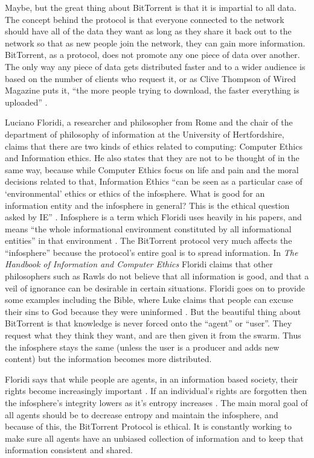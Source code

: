 \documentclass[11pt]{article}
\begin{document}
\begin{multicols}{2}
Maybe, but the great thing about BitTorrent is that it is impartial to all data. The concept behind the protocol is that everyone connected to the network should have all of the data they want as long as they share it back out to the network so that as new people join the network, they can gain more information. BitTorrent, as a protocol, does not promote any one piece of data over another. The only way any piece of data gets distributed faster and to a wider audience is based on the number of clients who request it, or as Clive Thompson of Wired Magazine puts it, ``the more people trying to download, the faster everything is uploaded'' \cite{wiredbt}.

Luciano Floridi, a researcher and philosopher from Rome and the chair of the department of philosophy of information at the University of Hertfordshire, claims that there are two kinds of ethics related to computing: Computer Ethics and Information ethics. He also states that they are not to be thought of in the same way, because while Computer Ethics focus on life and pain and the moral decisions related to that, Information Ethics ``can be seen as a particular case of `environmental' ethics or ethics of the infosphere. What is good for an information entity and the infosphere in general? This is the ethical question asked by IE'' \cite[1]{floridiInfo}. Infosphere is a term which Floridi uses heavily in his papers, and means ``the whole informational environment constituted by all informational entities'' in that environment \cite[3]{ethicshandbook}. The BitTorrent protocol very much affects the ``infosphere'' because the protocol's entire goal is to spread information. In \textit{The Handbook of Information and Computer Ethics} Floridi claims that other philosophers such as Rawls do not believe that all information is good, and that a veil of ignorance can be desirable in certain situations. Floridi goes on to provide some examples including the Bible, where Luke claims that people can excuse their sins to God because they were uninformed \cite[6]{ethicshandbook}. But the beautiful thing about BitTorrent is that knowledge is never forced onto the ``agent'' or ``user''. They request what they think they want, and are then given it from the swarm. Thus the infosphere stays the same (unless the user is a producer and adds new content) but the information becomes more distributed.

Floridi says that while people are agents, in an information based society, their rights become increasingly important \cite[4]{floridiInfo}. If an individual's rights are forgotten then the infosphere's integrity lowers as it's entropy increases \cite[10]{floridiInfo}. The main moral goal of all agents should be to decrease entropy and maintain the infosphere, and because of this, the BitTorrent Protocol is ethical. It is constantly working to make sure all agents have an unbiased collection of information and to keep that information consistent and shared.


\end{multicols}
\end{document}
